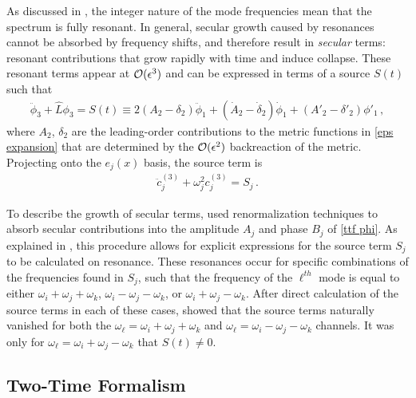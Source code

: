 \documentclass[../PhD.tex]{subfiles}
\begin{document}
As discussed in \cite{1412.3249, 1407.6273, 1508.04943}, the integer nature of the mode frequencies mean that the spectrum is fully resonant. In general, secular growth caused by resonances cannot be absorbed by frequency shifts, and therefore result in \emph{secular} terms: resonant contributions that grow rapidly with time and induce collapse. These resonant terms appear at $\mathcal O (\epsilon^3)$ and can be expressed in terms of a source $S(t)$ such that 
\begin{align}
\ddot \phi_3 + \hat L \phi_3 = S(t) \equiv 2 (A_2 - \delta_2) \ddot \phi_1 + ( \dot A_2 - \dot \delta_2 ) \dot \phi_1 + (A'_2 - \delta'_2) \phi'_1 \, ,
\end{align}
where $A_2$, $\delta_2$ are the leading-order contributions to the metric functions in \eqref{eps expansion} that are determined by the $\mathcal O(\epsilon^2)$ backreaction of the metric. Projecting onto the $e_j(x)$ basis, the source term is
\begin{align}
\ddot c_j^{(3)} + \omega_j^2 c_j^{(3)} = S_j \, .
\end{align}  

To describe the growth of secular terms, \cite{1412.3249} used renormalization techniques to absorb secular contributions into the amplitude $A_j$ and phase $B_j$ of \eqref{ttf phi}. As explained in \cite{1412.3249}, this procedure allows for explicit expressions for the source term $S_j$ to be calculated on resonance. These resonances occur for specific combinations of the frequencies found in $S_j$, such that the frequency of the $\ell^{th}$ mode is equal to either $\omega_i + \omega_j + \omega_k$, $\omega_i - \omega_j - \omega_k$, or $\omega_i + \omega_j - \omega_k$. After direct calculation of the source terms in each of these cases, \cite{1412.3249} showed that the source terms naturally vanished for both the $\omega_\ell = \omega_i + \omega_j + \omega_k$ and $\omega_\ell = \omega_i - \omega_j -\omega_k$ channels. It was only for $\omega_\ell = \omega_i + \omega_j - \omega_k$ that $S(t) \neq 0$.


\subsection{Two-Time Formalism}
\end{document}
